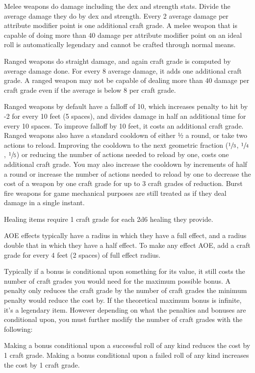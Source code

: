 Melee weapons do damage including the dex and strength stats. Divide the average damage they do by dex and strength. Every 2 average damage per attribute modifier point is one additional craft grade. A melee weapon that is capable of doing more than 40 damage per attribute modifier point on an ideal roll is automatically legendary and cannot be crafted through normal means.

Ranged weapons do straight damage, and again craft grade is computed by average damage done. For every 8 average damage, it adds one additional craft grade. A ranged weapon may not be capable of dealing more than 40 damage per craft grade even if the average is below 8 per craft grade.

Ranged weapons by default have a falloff of 10, which increases penalty to hit by -2 for every 10 feet (5 spaces), and divides damage in half an additional time for every 10 spaces. To improve falloff by 10 feet, it costs an additional craft grade. Ranged weapons also have a standard cooldown of either ½ a round, or take two actions to reload. Improving the cooldown to the next geometric fraction ($\sfrac{1}{3}$, $\sfrac{1}{4}$, $\sfrac{1}{5}$) or reducing the number of actions needed to reload by one, costs one additional craft grade. You may also increase the cooldown by increments of half a round or increase the number of actions needed to reload by one to decrease the cost of a weapon by one craft grade for up to 3 craft grades of reduction. Burst fire weapons for game mechanical purposes are still treated as if they deal damage in a single instant.

Healing items require 1 craft grade for each 2d6 healing they provide.

AOE effects typically have a radius in which they have a full effect, and a radius double that in which they have a half effect. To make any effect AOE, add a craft grade for every 4 feet (2 spaces) of full effect radius.

Typically if a bonus is conditional upon something for its value, it still costs the number of craft grades you would need for the maximum possible bonus. A penalty only reduces the craft grade by the number of craft grades the minimum penalty would reduce the cost by. If the theoretical maximum bonus is infinite, it’s a legendary item. However depending on what the penalties and bonuses are conditional upon, you must further modify the number of craft grades with the following:

Making a bonus conditional upon a successful roll of any kind reduces the cost by 1 craft grade. Making a bonus conditional upon a failed roll of any kind increases the cost by 1 craft grade.

